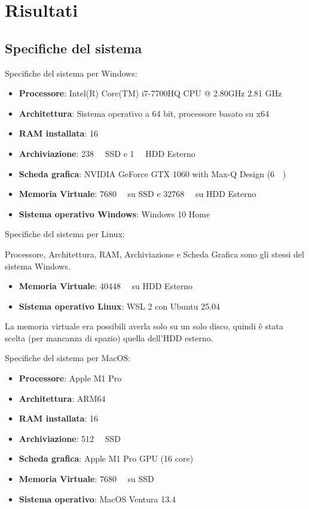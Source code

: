 \chapter{Risultati}

\section{Specifiche del sistema}

Specifiche del sistema per Windows:

\begin{itemize}
    \item \textbf{Processore}: Intel(R) Core(TM) i7-7700HQ CPU @ 2.80GHz   2.81 GHz
    \item \textbf{Architettura}: Sistema operativo a 64 bit, processore basato su x64
    \item \textbf{RAM installata}: \SI{16}{\giga\byte}
    \item \textbf{Archiviazione}: \SI{238}{\giga\byte} SSD e \SI{1}{\tera\byte} HDD Esterno
    \item \textbf{Scheda grafica}: NVIDIA GeForce GTX 1060 with Max-Q Design (\SI{6}{\giga\byte})
    \item \textbf{Memoria Virtuale}: \SI{7680}{\mega\byte} su SSD e \SI{32768}{\mega\byte} su HDD Esterno
    \item \textbf{Sistema operativo Windows}: Windows 10 Home
\end{itemize}

Specifiche del sistema per Linux:

Processore, Architettura, RAM, Archiviazione e Scheda Grafica sono gli stessi del sistema Windows.

\begin{itemize}
    \item \textbf{Memoria Virtuale}: \SI{40448}{\mega\byte} su HDD Esterno
    \item \textbf{Sistema operativo Linux}: WSL 2 con Ubuntu 25.04
\end{itemize}

La memoria virtuale era possibili averla solo su un solo disco, quindi è stata scelta (per mancanza di spazio) quella dell'HDD esterno.

Specifiche del sistema per MacOS:

\begin{itemize}
    \item \textbf{Processore}: Apple M1 Pro
    \item \textbf{Architettura}: ARM64
    \item \textbf{RAM installata}: \SI{16}{\giga\byte}
    \item \textbf{Archiviazione}: \SI{512}{\giga\byte} SSD
    \item \textbf{Scheda grafica}: Apple M1 Pro GPU (16 core)
    \item \textbf{Memoria Virtuale}: \SI{7680}{\mega\byte} su SSD
    \item \textbf{Sistema operativo}: MacOS Ventura 13.4
\end{itemize}

